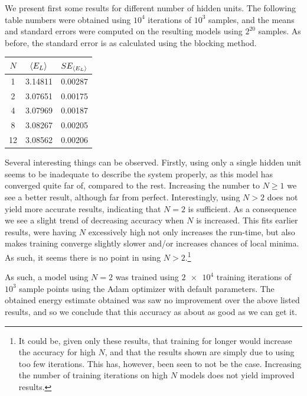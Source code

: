 \documentclass[a4paper, 11pt]{article}
\begin{document}
\begin{multicols}{2}
    We present first some results for different number of hidden units. The
    following table numbers were obtained using $10^4$ iterations of $10^3$
    samples, and the means and standard errors were computed on the resulting
    models using $2^{20}$ samples. As before, the standard error is as
    calculated using the blocking method.

    \begin{center}
        \vspace{0.5cm}
        \begin{tabular}{|c|c|c|}\hline
            $N$ & $\expval{E_L}$ & $SE_{\expval{E_L}}$\\\hline
            1 & 3.14811 & 0.00287\\
            2 & 3.07651 & 0.00175\\
            4 & 3.07969 & 0.00187\\
            8 & 3.08267 & 0.00205\\
            12 & 3.08562 & 0.00206\\\hline
        \end{tabular}
    \end{center}

    Several interesting things can be observed. Firstly, using only a single
    hidden unit seems to be inadequate to describe the system properly, as this
    model has converged quite far of, compared to the rest. Increasing the
    number to $N \geq 1$ we see a better result, although far from perfect.
    Interestingly, using $N>2$ does not yield more accurate results, indicating
    that $N=2$ is sufficient. As a consequence we see a slight trend of
    decreasing accuracy when $N$ is increased. This fits earlier results, were
    having $N$ excessively high not only increases the run-time, but also makes
    training converge slightly slower and/or increases chances of local minima.
    As such, it seems there is no point in using $N > 2$.\footnote{It could be,
    given only these results, that training for longer would increase the
    accuracy for high $N$, and that the results shown are simply due to using
    too few iterations. This has, however, been seen to not be the case.
    Increasing the number of training iterations on high $N$ models does not
    yield improved results.}
    
    As such, a model using $N=2$ was trained using $\num{2e4}$ training
    iterations of $10^3$ sample points using the Adam optimizer with default
    parameters. The obtained energy estimate obtained was saw no improvement
    over the above listed results, and so we conclude that this accuracy as
    about as good as we can get it. 
    

\end{multicols}
\end{document}
